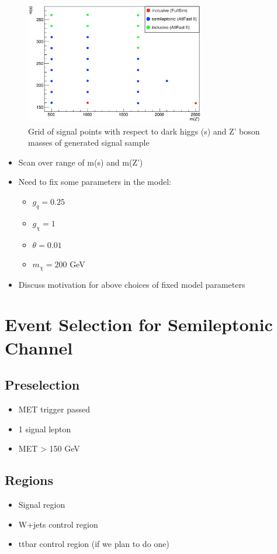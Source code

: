 \documentclass[12pt]{article}
\begin{document}
\begin{figure}[H]
	\centering
	\includegraphics[width=0.7\textwidth]{figures/SignalGrid.png}
	\caption{Grid of signal points with respect to dark higgs (s) and Z' boson masses of generated signal sample}
	\label{fig:signalgrid}
\end{figure}

\begin{itemize}
	\item Scan over range of m(s) and m(Z')
	\item Need to fix some parameters in the model:
	\begin{itemize}
		\item $g_{q} = 0.25$
		\item $g_{\chi} = 1$
		\item $\theta = 0.01$
		\item $m_{\chi} = 200$ GeV
	\end{itemize}
	\item Discuss motivation for above choices of fixed model parameters
\end{itemize}

\section{Event Selection for Semileptonic Channel}

\subsection{Preselection}
\begin{itemize}
\item MET trigger passed
\item 1 signal lepton
\item MET > 150 GeV
\end{itemize}
\subsection{Regions}
\begin{itemize}
\item Signal region
\item W+jets control region
\item ttbar control region (if we plan to do one)
\end{itemize}
\end{document}
